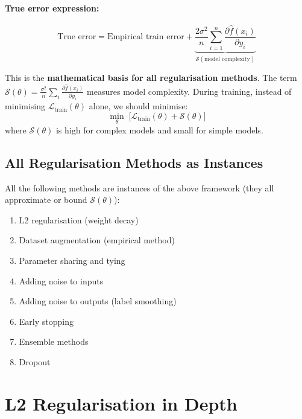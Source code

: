 \documentclass[12pt,a4paper]{article}
\newcommand{\Loss}{\mathcal{L}}
\newcommand{\Reg}{\mathcal{S}}
\begin{document}
\paragraph{True error expression:}
\[
  \boxed{
    \text{True error}
    = \text{Empirical train error}
    + \underbrace{\frac{2\sigma^2}{n}\sum_{i=1}^{n}\frac{\partial\hat{f}(x_i)}{\partial y_i}}_{\Reg(\text{model complexity})}
  }
\]

\begin{keybox}
This is the \textbf{mathematical basis for all regularisation methods}. The term $\Reg(\theta) = \frac{\sigma^2}{n}\sum_{i}\frac{\partial\hat{f}(x_i)}{\partial y_i}$ measures model complexity. During training, instead of minimising $\Loss_{\text{train}}(\theta)$ alone, we should minimise:
\[
  \min_{\theta}\;\bigl[\Loss_{\text{train}}(\theta) + \Reg(\theta)\bigr]
\]
where $\Reg(\theta)$ is high for complex models and small for simple models.
\end{keybox}

\subsection{All Regularisation Methods as Instances}

All the following methods are instances of the above framework (they all approximate or bound $\Reg(\theta)$):
\begin{enumerate}
  \item L2 regularisation (weight decay)
  \item Dataset augmentation (empirical method)
  \item Parameter sharing and tying
  \item Adding noise to inputs
  \item Adding noise to outputs (label smoothing)
  \item Early stopping
  \item Ensemble methods
  \item Dropout
\end{enumerate}

\section{L2 Regularisation in Depth}
\end{document}
